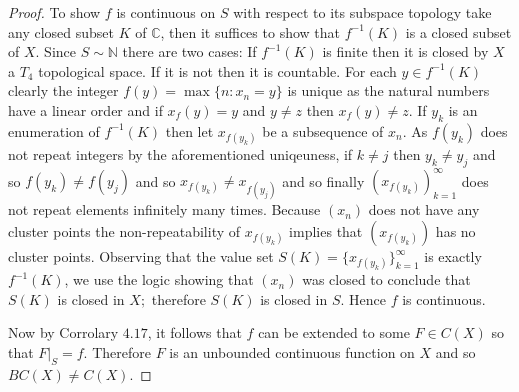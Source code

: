 \documentclass[11pt]{amsart}
\theoremstyle{definition}
\numberwithin{theorem}{section}
\numberwithin{definition}{section}
\numberwithin{equation}{section}
\begin{document}
\begin{proof}
	To show $f$ is continuous on $S$ with respect to its subspace topology take any closed subset $K$ of $\mathbb{C}$, then it suffices to show that $f^{-1}(K)$ is a closed subset of $X$. Since $S \sim \mathbb{N}$ there are two cases: If $f^{-1}(K)$ is finite then it is closed by $X$ a $T_4$ topological space. If it is not then it is countable. For each $y \in f^{-1}(K)$ clearly the integer $f(y) = \max \{ n : x_n = y\}$ is unique as the natural numbers have a linear order and if $x_f(y) = y$ and $y \neq z$ then $x_f(y) \neq z$. If $y_k$ is an enumeration of $f^{-1}(K)$ then let $x_{f(y_k)}$ be a subsequence of $x_n$. As $f(y_k)$ does not repeat integers by the aforementioned uniqeuness, if $k \neq j$ then $y_k \neq y_j$ and so $f(y_k) \neq f(y_j)$ and so $x_{f(y_k)} \neq x_{f(y_j)}$ and so finally $(x_{f(y_k)})_{k=1}^\infty$ does not repeat elements infinitely many times. Because $(x_n)$ does not have any cluster points the non-repeatability of $x_{f(y_k)}$ implies that $(x_{f(y_k)})$ has no cluster points. Observing that the value set $S(K) = \{x_{f(y_k)}\}_{k=1}^\infty$ is exactly $f^{-1}(K)$, we use the logic showing that $(x_n)$ was closed to conclude that $S(K)$ is closed in $X;$ therefore $S(K)$ is closed in $S$. Hence $f$ is continuous.

	Now by Corrolary $4.17$, it follows that $f$ can be extended to some $F \in C(X)$ so that $F|_S = f.$ Therefore $F$
	is an unbounded continuous function on $X$ and so $BC(X) \neq C(X).$
\end{proof}
\end{document}

